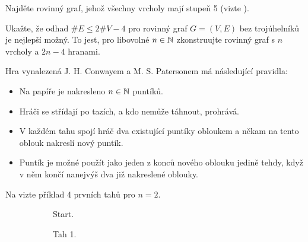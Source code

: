 \begin{exercise}
 Najděte rovinný graf, jehož všechny vrcholy mají stupeň 5 (vizte
 ).
\end{exercise}

\begin{exercise}
 Ukažte, že odhad $\# E \leq 2\# V - 4$ pro rovinný graf $G = (V,E)$ bez
 trojúhelníků je nejlepší možný. To jest, pro libovolné $n \in \mathbb{N}$ zkonstruujte
 rovinný graf s $n$ vrcholy a $2n - 4$ hranami.
\end{exercise}

\begin{exercise}
 Hra  vynalezená J. H. Conwayem a M. S. Patersonem má následující
 pravidla:
 \begin{itemize}
  \item Na papíře je nakresleno $n \in \mathbb{N}$ puntíků.
  \item Hráči se střídají po tazích, a kdo nemůže táhnout, prohrává.
  \item V každém tahu spojí hráč dva existující puntíky obloukem a někam na
   tento oblouk nakreslí nový puntík.
  \item Puntík je možné použít jako jeden z konců nového oblouku jedině tehdy,
   když v něm končí nanejvýš dva již nakreslené oblouky.
 \end{itemize}
 Na  vizte příklad 4 prvních tahů pro $n =
 2$.
 \begin{figure}[H]
  \centering
  \begin{subfigure}[b]{.19\textwidth}
   \centering
   \caption{Start.}
  \end{subfigure}
  \begin{subfigure}[b]{.19\textwidth}
   \centering
   \caption{Tah 1.}
  \end{subfigure}
  \begin{subfigure}[b]{.19\textwidth}
   \centering
\end{subfigure}
\end{figure}
\end{exercise}
